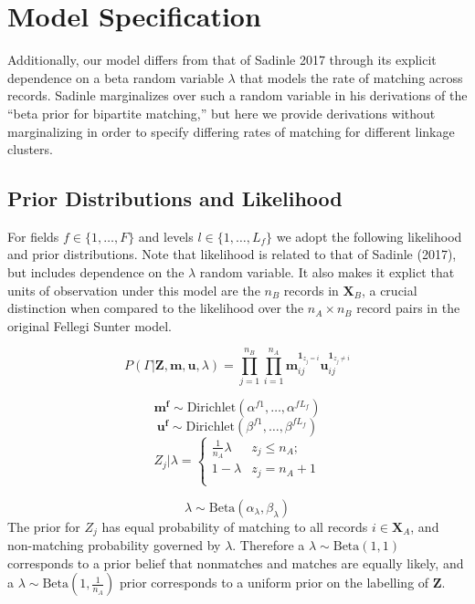 \documentclass[
  12pt,
]{article}
\begin{document}
\hypertarget{model-specification}{%
\section{Model Specification}\label{model-specification}}

Additionally, our model differs from that of Sadinle 2017 through its
explicit dependence on a beta random variable \(\lambda\) that models
the rate of matching across records. Sadinle marginalizes over such a
random variable in his derivations of the ``beta prior for bipartite
matching,'' but here we provide derivations without marginalizing in
order to specify differing rates of matching for different linkage
clusters.

\hypertarget{prior-distributions-and-likelihood}{%
\subsection{Prior Distributions and
Likelihood}\label{prior-distributions-and-likelihood}}

For fields \(f \in \{1, \ldots, F\}\) and levels
\(l\in \{1, \ldots, L_f\}\) we adopt the following likelihood and prior
distributions. Note that likelihood is related to that of Sadinle
(2017), but includes dependence on the \(\lambda\) random variable. It
also makes it explict that units of observation under this model are the
\(n_B\) records in \(\mathbf{X}_B\), a crucial distinction when compared
to the likelihood over the \(n_A \times n_B\) record pairs in the
original Fellegi Sunter model.

\[P(\Gamma|\mathbf{Z}, \mathbf{m}, \mathbf{u}, \lambda) =\prod_{j=1}^{n_B}  \prod_{i=1}^{n_A}\mathbf{m}_{ij}^{\mathbf{1}_{z_j = i}}\mathbf{u}_{ij}^{\mathbf{1}_{z_j \neq i}}\]

\[\mathbf{m^{f}} \sim \text{Dirichlet}(\alpha^{f1}, \ldots, \alpha^{fL_f})\]
\[\mathbf{u^{f}} \sim \text{Dirichlet}(\beta^{f1}, \ldots, \beta^{fL_f})\]
\[Z_j | \lambda =
\begin{cases} 
    \frac{1}{n_A}\lambda  & z_j \leq n_A; \\
     1-\lambda &  z_j  = n_A + 1 \\
\end{cases}\]

\[\lambda \sim \text{Beta}(\alpha_{\lambda}, \beta_{\lambda}) \] The
prior for \(Z_j\) has equal probability of matching to all records
\(i\in \mathbf{X}_A\), and non-matching probability governed by
\(\lambda\). Therefore a \(\lambda \sim \text{Beta}(1, 1)\) corresponds
to a prior belief that nonmatches and matches are equally likely, and a
\(\lambda \sim \text{Beta}(1, \frac{1}{n_A})\) prior corresponds to a
uniform prior on the labelling of \(\mathbf{Z}\).
\end{document}
